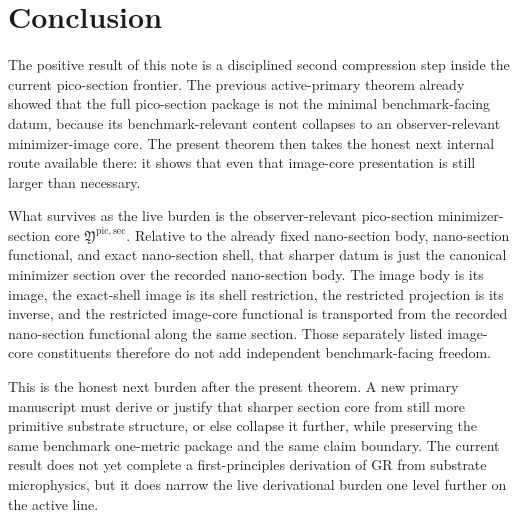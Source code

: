 \documentclass[11pt]{article}
\newcommand{\PicoMinSectionCore}{\mathfrak Y^{\mathrm{pic,sec}}}
\begin{document}
\section{Conclusion}

The positive result of this note is a disciplined second compression step inside the current pico-section frontier. The previous active-primary theorem already showed that the full pico-section package is not the minimal benchmark-facing datum, because its benchmark-relevant content collapses to an observer-relevant minimizer-image core. The present theorem then takes the honest next internal route available there: it shows that even that image-core presentation is still larger than necessary.

What survives as the live burden is the observer-relevant pico-section minimizer-section core \(\PicoMinSectionCore\). Relative to the already fixed nano-section body, nano-section functional, and exact nano-section shell, that sharper datum is just the canonical minimizer section over the recorded nano-section body. The image body is its image, the exact-shell image is its shell restriction, the restricted projection is its inverse, and the restricted image-core functional is transported from the recorded nano-section functional along the same section. Those separately listed image-core constituents therefore do not add independent benchmark-facing freedom.

This is the honest next burden after the present theorem. A new primary manuscript must derive or justify that sharper section core from still more primitive substrate structure, or else collapse it further, while preserving the same benchmark one-metric package and the same claim boundary. The current result does not yet complete a first-principles derivation of GR from substrate microphysics, but it does narrow the live derivational burden one level further on the active line.
\end{document}
